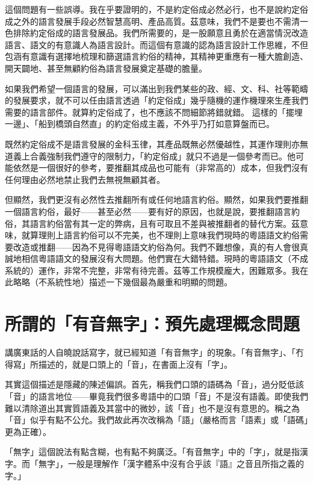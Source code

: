 \documentclass[a5paper, 12pt, openany]{book} %
\begin{document}
這個問題有一些誤導。我在乎要證明的，不是約定俗成必然必行，也不是說約定俗成之外的語言發展手段必然智慧高明、產品高質。茲意味，我們不是要也不需清一色排除約定俗成的語言發展品。我們所需要的，是一股願意且勇於在適當情況改造語言、語文的有意識人為語言設計。而這個有意識的認為語言設計工作思維，不但包涵有意識有選擇地梳理和篩選語言約俗的精神，其精神更重應有一種大膽創造、開天闢地、甚至無顧約俗為語言發展奠定基礎的膽量。

如果我們希望一個語言的發展，可以滿出到我們某些的政、經、文、科、社等範疇的發展要求，就不可以任由語言透過「約定俗成」幾乎隨機的運作機理來生產我們需要的語言部件。就算約定俗成了，也不應該不問細節將錯就錯。 這樣的「擺埋一邊」、「船到橋頭自然直」的約定俗成主義，不外乎乃打如意算盤而已。

既然約定俗成不是語言發展的金科玉律，其產品既無必然優越性，其運作理則亦無道義上合義強制我們遵守的限制力，「約定俗成」就只不過是一個參考而已。他可能依然是一個很好的參考，要推翻其成品也可能有（非常高的）成本，但我們沒有任何理由必然地禁止我們去無視無顧其者。

但顯然，我們更沒有必然性去推翻所有或任何地語言約俗。顯然，如果我們要推翻一個語言約俗，最好——甚至必然——要有好的原因，也就是說，要推翻語言約俗，其語言約俗當有其一定的弊病，且有可取且不差與被推翻者的替代方案。茲意味，就算理則上語言約俗可以不完美，也不理則上意味我們現時的粵語語文約俗需要改造或推翻——因為不見得粵語語文約俗為何。我們不難想像，真的有人會很真誠地相信粵語語文的發展沒有大問題。他們實在大錯特錯。現時的粵語語文（不成系統的）運作，非常不完整，非常有待完善。茲等工作規模龐大，困難眾多。我在此略略（不系統性地）描述一下幾個最為嚴重和明顯的問題。

\section{所謂的「有音無字」：預先處理概念問題}

講廣東話的人自曉說話寫字，就已經知道「有音無字」的現象。「有音無字」、「冇得寫」所描述的，就是口頭上的「音」，在書面上沒有「字」。

其實這個描述是隱藏的陳述偏誤。首先，稱我們口頭的語碼為「音」，過分貶低該「音」的語言地位——畢竟我們很多粵語中的口頭「音」不是沒有語義。即使我們難以清除道出其實質語義及其當中的微妙，該「音」也不是沒有意思的。稱之為「音」似乎有點不公允。我們故此再次改稱為「語」（嚴格而言「語素」或「語碼」更為正確）。

「無字」這個說法有點含糊，也有點不夠廣泛。「有音無字」中的「字」，就是指漢字。而「無字」，一般是理解作「漢字體系中沒有合乎該『語』之音且所指之義的字。」
\end{document}
